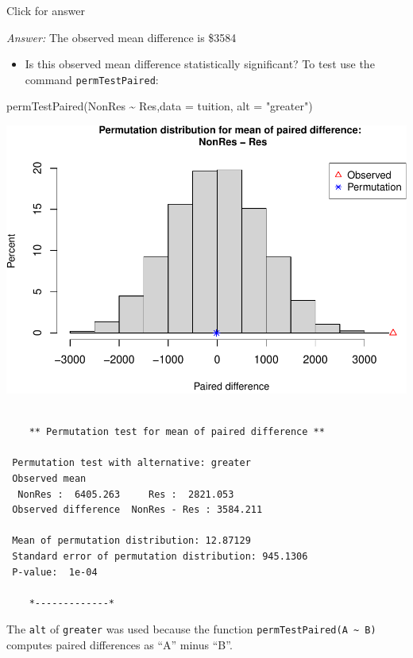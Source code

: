 \documentclass[
]{book}
\newenvironment{Shaded}{\begin{snugshade}}{\end{snugshade}}
\newcommand{\AttributeTok}[1]{\textcolor[rgb]{0.77,0.63,0.00}{#1}}
\newcommand{\FunctionTok}[1]{\textcolor[rgb]{0.00,0.00,0.00}{#1}}
\newcommand{\NormalTok}[1]{#1}
\newcommand{\SpecialCharTok}[1]{\textcolor[rgb]{0.00,0.00,0.00}{#1}}
\newcommand{\StringTok}[1]{\textcolor[rgb]{0.31,0.60,0.02}{#1}}
\providecommand{\tightlist}{%
  \setlength{\itemsep}{0pt}\setlength{\parskip}{0pt}}
\begin{document}
Click for answer

\emph{Answer:} The observed mean difference is \$3584

\begin{itemize}
\tightlist
\item
  Is this observed mean difference statistically significant? To test use the command \texttt{permTestPaired}:
\end{itemize}

\begin{Shaded}
\begin{Highlighting}[]
\FunctionTok{permTestPaired}\NormalTok{(NonRes }\SpecialCharTok{\textasciitilde{}}\NormalTok{ Res,}\AttributeTok{data =}\NormalTok{ tuition, }\AttributeTok{alt =} \StringTok{"greater"}\NormalTok{)}
\end{Highlighting}
\end{Shaded}

\includegraphics[width=1\linewidth]{Class_Activity_13_files/figure-latex/unnamed-chunk-5-1}

\begin{verbatim}

    ** Permutation test for mean of paired difference **

 Permutation test with alternative: greater 
 Observed mean
  NonRes :  6405.263     Res :  2821.053 
 Observed difference  NonRes - Res : 3584.211 

 Mean of permutation distribution: 12.87129 
 Standard error of permutation distribution: 945.1306 
 P-value:  1e-04 

    *-------------*
\end{verbatim}

The \texttt{alt} of \texttt{greater} was used because the function \texttt{permTestPaired(A\ \textasciitilde{}\ B)} computes paired differences as ``A'' minus ``B''.
\end{document}
